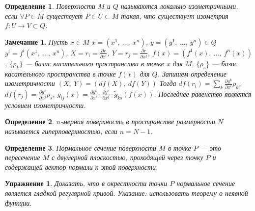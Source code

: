 \documentclass[12pt]{article}
\theoremstyle{plain}
\newtheorem*{exercise}{Упражнение}
\newtheorem{definition}{Определение}[section]
\newtheorem{remark}{Замечание}
\begin{document}
    \begin{definition}
        Поверхности $M$ и $Q$ называются локально изометричными, если $\forall P\in M$ существует $P\in U\subset M$ такая, что существует изометрия $f:U\to V\subset Q$.
    \end{definition}
    \begin{remark}
        Пусть $x\in M$ $x=(x^1, \ \ldots, \ x^n)$, $y=(y^1, \ \ldots, \ y^n)\in Q$ $y^i=f^i(x^1, \ \ldots, \ x^n)$, $X=r_i=\frac{\partial r}{\partial x^i}$, $Y=r_j=\frac{\partial r}{\partial x^j}$, $f(x)=(f^1(x), \ \ldots, \ f^n(x))$, $\{\rho_k\}$ --- базис касательного пространства в точке $x$ для $M$, $\{\rho_s\}$ --- базис касательного пространства в точке $f(x)$ для $Q$. Запишем определение изометричности  $(X, \ Y)=(df(X), \ df(Y))$ Тогда $df(r_i)=\sum\limits_k\frac{\partial y^k}{\partial x^i}\rho_k$, $df(r_j)=\frac{\partial y^s}{\partial x^j}\rho_s$, $g_{ij}(x)=\frac{\partial y^k}{\partial x^i}\cdot\frac{\partial y^s}{\partial x^j}\cdot\tilde{g}_{ks}(f(x))$. Последнее равенство является условием изометричности.
    \end{remark}
    \begin{definition}
        $n$-мерная поверхность в пространстве размерности $N$ называется гиперповерхностью, если $n=N-1$.
    \end{definition}
    \begin{definition}
        Нормальное сечение поверхности $M$ в точке $P$ --- это пересечение $M$ с двумерной плоскостью, проходящей через точку $P$ и содержащей вектор нормали к этой поверхности.
    \end{definition}
    \begin{exercise}
        Доказать, что в окрестности точки $P$ нормальное сечение является гладкой регулярной кривой. Указание: использовать теорему о неявной функции.
    \end{exercise}
\end{document}

